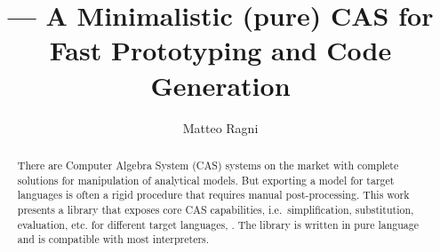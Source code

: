 \documentclass{article}
\begin{document}

\title{\ragnicas --- A Minimalistic (pure) \Ruby CAS for Fast Prototyping and Code Generation}

\author{Matteo Ragni}

\begin{abstract}
There are Computer Algebra System (CAS) systems on the market with complete solutions for manipulation of analytical models. But exporting a model  for target languages  is often a rigid procedure that requires manual post-processing.
This work presents a \Ruby library that exposes core CAS capabilities, i.e.\ simplification, substitution, evaluation, etc.  for different target languages, .
The library is written in pure \Ruby language and is compatible with most \Ruby interpreters.
\end{abstract}

















\end{document}
